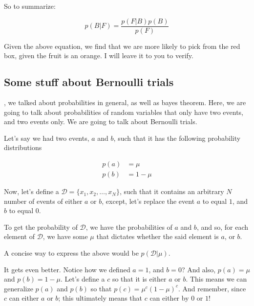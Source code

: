 \documentclass{tufte-handout}
\begin{document}
So to summarize:

\begin{equation}
  p(B|F) = \frac{p(F|B)p(B)}{p(F)}
\end{equation}

Given the above equation, we find that we are more likely to pick from the red
box, given the fruit is an orange. I will leave it to you to verify.

\subsection{Some stuff about Bernoulli trials}


, we talked about probabilities in general, as well as
bayes theorem. Here, we are going to talk about probabilities of random
variables that only have two events, and two events only. We are going to talk
about Bernoulli trials.

Let's say we had two events, $a$ and $b$, such that it has the following
probability distributions

\begin{equation}
  \begin{aligned}
    p(a) &= \mu \\
    p(b) &= 1 - \mu
  \end{aligned}
\end{equation}

Now, let's define a $\mathcal{D} = \{x_1, x_2, \ldots, x_N\}$, such that it
contains an arbitrary $N$ number of events of either $a$ or $b$, except, let's
replace the event $a$ to equal $1$, and $b$ to equal $0$.

To get the probability of $\mathcal{D}$, we have the probabilities of $a$ and
$b$, and so, for each element of $\mathcal{D}$, we have some $\mu$ that dictates
whether the said element is $a$, or $b$.

A concise way to express the above would be $p(\mathcal{D}|\mu)$.

It gets even better. Notice how we defined $a = 1$, and $b = 0$? And also,
$p(a) = \mu$ and $p(b) = 1 - \mu$. Let's define a $c$ so that it is either $a$
or $b$. This means we can generalize $p(a)$ and $p(b)$ so that
$p(c) = \mu^c(1 - \mu)^c$. And remember, since $c$ can either $a$ or $b$; this
ultimately means that $c$ can either by $0$ or $1$!
\end{document}
